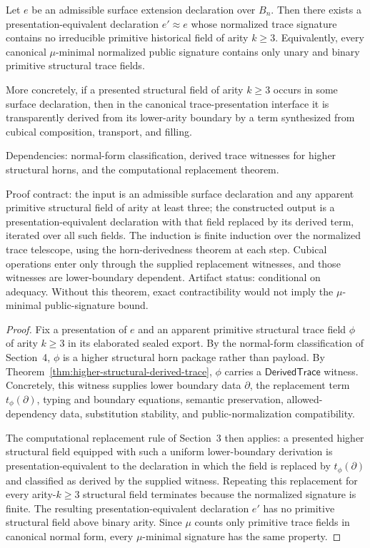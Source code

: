\documentclass{lmcs}
\begin{document}
\begin{thm}
\label{thm:minimal-signature-elimination}
Let \(e\) be an admissible surface extension declaration over \(B_n\).  Then there exists a
presentation-equivalent declaration \(e'\approx e\) whose normalized trace signature contains
no irreducible primitive historical field of arity \(k\geq 3\).  Equivalently, every canonical
\(\mu\)-minimal normalized public signature contains only unary and binary primitive
structural trace fields.

More concretely, if a presented structural field of arity \(k\geq 3\) occurs in some surface
declaration, then in the canonical trace-presentation interface it is transparently derived
from its lower-arity boundary by a term synthesized from cubical composition, transport, and
filling.

Dependencies: normal-form classification, derived trace witnesses for higher structural
horns, and the computational replacement theorem.

Proof contract: the input is an admissible surface declaration and any
apparent primitive structural field of arity at least three; the constructed
output is a presentation-equivalent declaration with that field replaced by its
derived term, iterated over all such fields.  The induction is finite induction
over the normalized trace telescope, using the horn-derivedness theorem at each
step.  Cubical operations enter only through the supplied replacement witnesses,
and those witnesses are lower-boundary dependent.  Artifact status: conditional
on adequacy.  Without this theorem, exact contractibility would not imply the
\(\mu\)-minimal public-signature bound.
\end{thm}

\begin{proof}
Fix a presentation of \(e\) and an apparent primitive structural trace field \(\phi\) of arity
\(k\geq 3\) in its elaborated sealed export.  By the normal-form classification of Section~4,
\(\phi\) is a higher structural horn package rather than payload.  By
Theorem~\ref{thm:higher-structural-derived-trace}, \(\phi\) carries a
\(\mathsf{DerivedTrace}\) witness.  Concretely, this witness supplies lower boundary data
\(\partial\), the replacement term \(t_\phi(\partial)\), typing and boundary equations,
semantic preservation, allowed-dependency data, substitution stability, and
public-normalization compatibility.

The computational replacement rule of Section~3 then applies: a presented higher structural
field equipped with such a uniform lower-boundary derivation is presentation-equivalent to
the declaration in which the field is replaced by \(t_{\phi}(\partial)\) and classified as
derived by the supplied witness.
Repeating this replacement for every arity-\(k\geq 3\) structural field terminates because the
normalized signature is finite.  The resulting presentation-equivalent declaration \(e'\) has
no primitive structural field above binary arity.  Since \(\mu\) counts only primitive trace
fields in canonical normal form, every \(\mu\)-minimal signature has the same property.
\end{proof}
\end{document}
